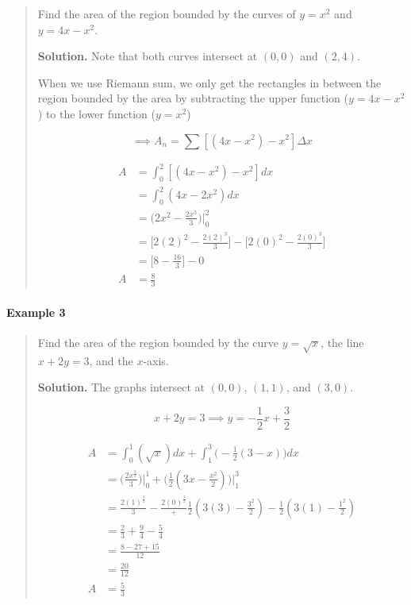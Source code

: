 \documentclass[
]{article}
\begin{document}
\begin{quote}
Find the area of the region bounded by the curves of \(y=x^2\) and
\(y = 4x-x^2\).

\textbf{Solution.} Note that both curves intersect at \((0,0)\) and
\((2,4)\).

When we use Riemann sum, we only get the rectangles in between the
region bounded by the area by subtracting the upper function
(\(y=4x-x^2\)) to the lower function (\(y=x^2\))

\[ \implies A_n = \sum [(4x-x^2)-x^2]\Delta x \]

\begin{align*}
A &= \int_0^2[(4x-x^2)-x^2]dx\\
&= \int_0^2(4x-2x^2)dx\\
&= \Big(2x^2-\frac{2x^3}{3}\Big)\Bigg|_0^2\\
&= \Big[2(2)^2-\frac{2(2)^3}{3}\Big]-\Big[2(0)^2-\frac{2(0)^3}{3}\Big]\\
&= \Big[8-\frac{16}{3}\Big]-0\\
A &= \frac{8}{3}
\end{align*}
\end{quote}

\hypertarget{example-3-1}{%
\paragraph*{Example 3}\label{example-3-1}}

\begin{quote}
Find the area of the region bounded by the curve \(y=\sqrt{x}\), the
line \(x+2y =3\), and the \(x\)-axis.

\textbf{Solution.} The graphs intersect at \((0,0)\), \((1,1)\), and
\((3,0)\).

\[ x+2y = 3 \implies y  = -\frac{1}{2}x + \frac{3}{2} \]

\begin{align*}
A &= \int_0^1 (\sqrt{x})dx + \int_1^3 \Big(-\frac{1}{2}(3-x)\Big)dx\\
&= \Big(\frac{2x^{\frac{3}{2}}}{3}\Big) \Bigg|_0^1 + \Big(\frac{1}{2}(3x - \frac{x^2}{2})\Big)\Bigg|_1^3\\
&= \frac{2(1)^{\frac{3}{2}}}{3} - \frac{2(0)^{\frac{3}{2}}} + \frac{1}{2}(3(3) - \frac{3^2}{2}) - \frac{1}{2}(3(1) - \frac{1^2}{2})\\
&= \frac{2}{3}+ \frac{9}{4} - \frac{5}{4}\\
&= \frac{8-27+15}{12}\\
&= \frac{20}{12}\\
A &= \frac{5}{3}
\end{align*}
\end{quote}
\end{document}
